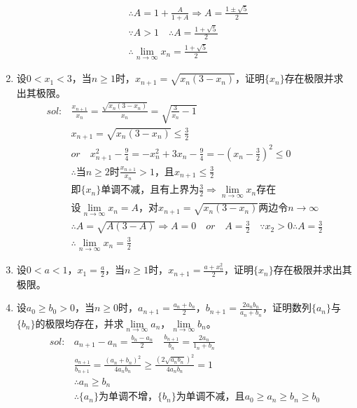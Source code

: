 \begin{enumerate}[{例}1.]
\begin{align*}
                &\therefore A=1+\frac{A}{1+A}\Rightarrow A=\frac{1\pm\sqrt{5}}{2}\\
                &\because A>1\quad\therefore A=\frac{1+\sqrt{5}}{2}\\
                &\therefore \lim_{n \to \infty}x_n=\frac{1+\sqrt{5}}{2}
        \end{align*}
    \item 设$0<x_1<3$，当$n\geq1$时，$x_{n+1}=\sqrt{x_n(3-x_n)}$，证明$\{x_n\}$存在极限并求出其极限。
        \begin{align*}
            sol:&\frac{x_{n+1}}{x_n}=\frac{\sqrt{x_n(3-x_n)}}{x_n}=\sqrt{\frac{3}{x_n}-1}\\
                &x_{n+1}=\sqrt{x_n(3-x_n)}\leq \frac{3}{2}\\
                &or\quad x_{n+1}^2-\frac{9}{4}=-x_n^2+3x_n-\frac{9}{4}=-(x_n-\frac{3}{2})^2\leq 0\\
                &\therefore\mbox{当}n\geq 2\mbox{时}\frac{x_{n+1}}{x_n}>1\mbox{，且}x_{n+1}\leq \frac{3}{2}\\
                &\mbox{即}\{x_n\}\mbox{单调不减，且有上界为}\frac{3}{2}\Rightarrow \lim_{n \to \infty}x_n\mbox{存在}\\
                &\mbox{设}\lim_{n \to \infty}x_n=A\mbox{，对}x_{n+1}=\sqrt{x_n(3-x_n)}\mbox{两边令}n\to \infty\\
                &\therefore A=\sqrt{A(3-A)}\Rightarrow A=0\quad or \quad A=\frac{3}{2}\quad \because x_2>0 \therefore A=\frac{3}{2}\\
                &\therefore \lim_{n \to \infty}x_n=\frac{3}{2}
        \end{align*}
    \item 设$0<a<1$，$x_1 =\frac{a}{2}$，当$n\geq1$时，$x_{n+1}=\frac{a+x_n^2}{2}$，证明$\{x_n\}$存在极限并求出其极限。
    \item 设$a_0\geq b_0>0$，当$n\geq 0$时，$a_{n+1}=\frac{a_n+b_n}{2}$，$b_{n+1}=\frac{2 a_n b_n}{a_n + b_n}$，证明数列$\{a_n\}$与$\{b_n\}$的极限均存在，并求$\lim\limits_{n\to \infty}a_n$，$\lim\limits_{n \to \infty}b_n$。
        \begin{align*}
            sol:&a_{n+1}-a_n=\frac{b_n-a_n}{2}\quad\frac{b_{n+1}}{b_n}=\frac{2a_n}{1_n+b_n}\\
                &\frac{a_{n+1}}{b_{n+1}}=\frac{(a_n+b_n)^2}{4a_nb_n}\geq\frac{(2\sqrt{a_nb_n})^2}{4a_nb_n}=1\\
                &\therefore a_n\geq b_n\\
                &\therefore \{a_n\}\mbox{为单调不增，}\{b_n\}\mbox{为单调不减，且}a_0\geq a_n\geq b_n\geq b_0\\

\end{align*}
\end{enumerate}
